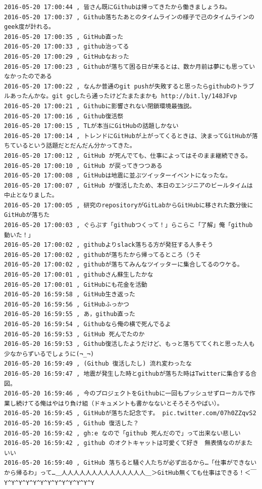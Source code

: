 \begin{verbatim}
2016-05-20 17:00:44 , 皆さん既にGithubは帰ってきたから働きましょうね。
2016-05-20 17:00:37 , Github落ちたあとのタイムラインの様子で己のタイムラインのgeek度が計れる。
2016-05-20 17:00:35 , GitHub直った
2016-05-20 17:00:33 , github治ってる
2016-05-20 17:00:29 , GitHubなおった
2016-05-20 17:00:23 , Githubが落ちて困る日が来るとは、数か月前は夢にも思っていなかったのである
2016-05-20 17:00:22 , なんか普通のgit pushが失敗すると思ったらgithubのトラブルあったんかな。git gcしたら通ったけどたまたまかも http://bit.ly/148JFvp 
2016-05-20 17:00:21 , Githubに影響されない閉鎖環境最強説。
2016-05-20 17:00:16 , Github復活祭
2016-05-20 17:00:15 , TLが本当にGitHubの話題しかない
2016-05-20 17:00:14 , トレンドにGitHubが上がってくるときは、決まってGitHubが落ちているという話題だとだんだん分かってきた。
2016-05-20 17:00:12 , GitHub が死んでても、仕事によってはそのまま継続できる。
2016-05-20 17:00:10 , GitHub が戻ってきつつある
2016-05-20 17:00:08 , GitHubは地震に並ぶツイッターイベントになったな。
2016-05-20 17:00:07 , GitHub が復活したため、本日のエンジニアのビールタイムは中止となりました。
2016-05-20 17:00:05 , 研究のrepositoryがGitLabからGitHubに移された数分後にGitHubが落ちた
2016-05-20 17:00:03 , ぐらぷす「githubつくって！」らこらこ「了解」俺「github動いた！」
2016-05-20 17:00:02 , githubよりslack落ちる方が発狂する人多そう
2016-05-20 17:00:02 , githubが落ちたから帰ってるところ（うそ
2016-05-20 17:00:02 , githubが落ちてみんなツイッターに集合してるのウケる。
2016-05-20 17:00:01 , githubさん蘇生したかな
2016-05-20 17:00:01 , GitHubにも花金を活動
2016-05-20 16:59:58 , GitHub生き返った
2016-05-20 16:59:56 , GitHubふっかつ
2016-05-20 16:59:55 , あ，github直った
2016-05-20 16:59:54 , Githubなら俺の横で死んでるよ
2016-05-20 16:59:53 , GitHub 死んでたのか
2016-05-20 16:59:53 , Github復活したようだけど、もっと落ちててくれと思った人も少なからずいるでしょうに(¬_¬)
2016-05-20 16:59:49 , (Github 復活したし) 流れ変わったな
2016-05-20 16:59:47 , 地震が発生した時とgithubが落ちた時はTwitterに集合する合図。
2016-05-20 16:59:46 , 今のプロジェクトをGithubに一回もプッシュせずローカルで作業し続けてる俺はやはり負け組（ドキュメントも書かなないとそろそろやばい）。
2016-05-20 16:59:45 , GitHubが落ちた記念です。 pic.twitter.com/07h0ZZqvS2
2016-05-20 16:59:45 , Github 復活した？
2016-05-20 16:59:42 , gh:e なので「github 死んだので」って出来ない悲しい
2016-05-20 16:59:42 , github のオクトキャットは可愛くて好き　無表情なのがまたいい
2016-05-20 16:59:40 , GitHub 落ちると騒ぐ人たちが必ず出るから…「仕事ができないから帰るわ」って…＿人人人人人人人人人人人人人人＿＞GitHub無くても仕事はできる！＜￣Y^Y^Y^Y^Y^Y^Y^Y^Y^Y^Y^Y^Y

\end{verbatim}
